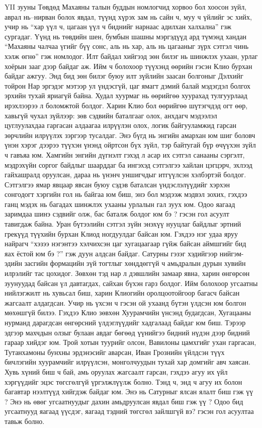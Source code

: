 YII зууны Төвдөд Махаяны талын буддын номлогчид хорвоо бол хоосон зүйл, аврал нь–нирван болох явдал, түүнд хүрэх зам нь сайн ч, муу ч үйлийг эс хийх, учир нь “хар үүл ч, цагаан үүл ч биднийг нарнаас адилхан халхална” гэж сургадаг. Үүнд нь төвдийн шен, бумбын шашны мэргэдүүд ард түмэнд хандан “Махаяны чалчаа үгийг бүү сонс, аль нь хар, аль нь цагааныг зүрх сэтгэл чинь хэлж өгнө” гэж номлодог. Илт байдал хийгээд зөн билэг нь шинжлэх ухаан, урлаг хоёрын зааг дээр байдаг аж. Ийм ч болохоор түүхэнд өөрийн гэсэн Клио бурхан байдаг ажгуу.
Энд бид зөн билэг буюу илт зүйлийн заасан болгоныг Дэлхийг тойрон Нар эргэдэг мэтээр ул үндэсгүй, цаг ямагт дэмий балай мэдэгдэл болгох эрхийн тухай яриагүй байна. Худал хуурмаг нь өөрийгөө хуурахад тулгуурлаад ирэхлээрээ л боломжтой болдог. Харин Клио бол өөрийгөө шүтэгчдэд огт өөр, хавьгүй чухал зүйлээр: зөв сэдвийн баталгааг олох, анхдагч мэдээлэл цуглуулахдаа гаргасан алдаагаа илрүүлэн олох, логик байгууламжид гарсан зөрчлийн илрүүлэх зэргээр тусалдаг. Энэ бүгд нь энгийн амархан юм шиг боловч үнэн хэрэг дээрээ түүхэн үнэнд ойртсон бүх зүйл, тэр байтугай бүр өчүүхэн зүйл ч гавъяа юм.
Хамгийн энгийн дүгнэлт гэхэд л асар их сэтгэл санааны сэргэлт, мэдрэхүйн соргог байдлыг шаарддаг ба ингэхэд сэтгэлгээ хайлан цэгцэрч, эхлээд гайхашралд оруулсан, дараа нь үнэнч уншигчдыг итгүүлсэн хэлбэртэй болдог. Сэтгэлгээ ямар явцаар явсан буюу сэдэв баталсан үндэслэлүүдийг хэрхэн сонгодогт хэргийн гол нь байгаа юм биш, энэ бол мэдээж мэдвэл зохих, гэхдээ ганц мэдэх нь багадах шинжлэх ухааны урлалын гал зуух юм. Одоо яагаад заримдаа шинэ сэдвийг олж, бас баталж болдог юм бэ ? гэсэн гол асуулт тавигдаж байна. Уран бүтээлийн сэтгэл зүйн энэхүү нууцлаг байдлыг эртний грекүүд түүхийн бурхан Клиод ногдуулдаг байсан юм.
Гэхдээ нэг удаа яруу найрагч “хэзээ нэгэнтээ хэлчихсэн цаг хугацаагаар гүйж байсан аймшгийг бид яах ёстой юм бэ ?” гэж дуун алдсан байдаг. Сатурны гэзэг хэдийгээр нийгэм-эдийн засгийн формацийн зүй тогтлыг хөнддөггүй ч амьдралын дурын хувийн илрэлийг тас цохидог. Зөвхөн тэд нар л дэвшлийн замаар явна, харин өнгөрсөн зуунуудад байсан үл давтагдах, сайхан бүхэн гарз болдог. Ийм болохоор угсаатны нийлэгжилт нь хувьсал биш, харин Клиогийн оролцоотойгоор багасч байсан жагсаалт алдагдсан. Учир нь үхсэн ч гэсэн ой ухаанд бүтэн үлдсэн юм болгон мөхөшгүй билээ.
Гэхдээ Клио зөвхөн Хуурамчийн үнсэнд будагдсан, Хугацааны нурманд дарагдсан өнгөрсний үлдэглүүдийг хадгалаад байдаг юм биш. Тэрээр эдгээр махчдын олзыг булаан авдаг бөгөөд үүнийгээ бидний нүдэн дээр бидний гараар хийдэг юм. Трой хотын туурийг олсон, Вавилоны цамхгийг ухан гаргасан, Тутанхамоны бунхны эрдэнэсийг аварсан, Иван Грознийн үйлдсэн түүх бичлэгийн хуурамчийг илрүүлсэн, монголчуудын тухай хар домгийг авч хаясан. Хувь хүний биш ч бай, амь оруулах жагсаалт гарсан, гэхдээ агуу их үйл хэргүүдийг эцэс төгсгөлгүй үргэлжлүүлж болно. Тэнд ч, энд ч агуу их болон багавтар нээлтүүд хийгдэж байдаг юм.
Энэ нь Сатурныг ялсан ялалт биш гэж үү ? Энэ нь өвөг угсаатнуудыг дахин амьдруулсан явдал биш гэж үү ?
Одоо бид угсаатнууд яагаад үүсдэг, яагаад тэдний төгсгөл зайлшгүй вэ? гэсэн гол асуултаа тавьж болно.
